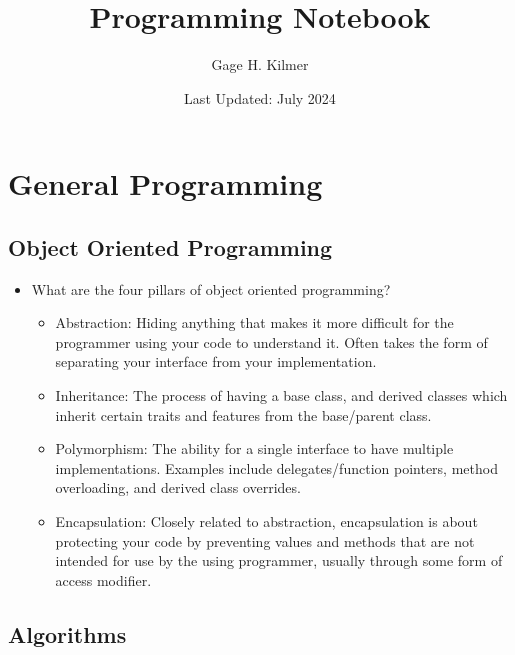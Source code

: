 \documentclass{article}
\title{Programming Notebook}
\author{Gage H. Kilmer}
\date{Last Updated: July 2024}
\begin{document}
\maketitle

\newpage
\tableofcontents

\newpage
\section{General Programming}
\subsection{Object Oriented Programming}
\begin{itemize}
    \item What are the four pillars of object oriented programming?
    \begin{itemize}
        \item Abstraction: Hiding anything that makes it more difficult for the programmer using your code to understand it. Often takes the form of separating your interface from your implementation.
        \item Inheritance: The process of having a base class, and derived classes which inherit certain traits and features from the base/parent class.
        \item Polymorphism: The ability for a single interface to have multiple implementations. Examples include delegates/function pointers, method overloading, and derived class overrides.
        \item Encapsulation: Closely related to abstraction, encapsulation is about protecting your code by preventing values and methods that are not intended for use by the using programmer, usually through some form of access modifier.
    \end{itemize}
\end{itemize}
\subsection{Algorithms}
\end{document}
